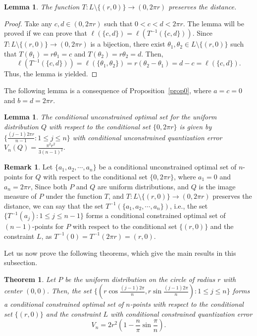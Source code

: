 \documentclass[12pt, reqno]{amsart}
\theoremstyle{plain}
\newtheorem{theorem1}[subsubsection]{Theorem}
\newtheorem{lemma1}[subsubsection]{Lemma}
\theoremstyle{definition}
\newtheorem{remark1}[subsubsection]{Remark}
\newcommand{\set}[1]{\{#1\}}%
\newcommand{\gq}{\theta}
\begin{document}
\begin{lemma1}\label{lemma22} 
The function $T: L\setminus \set{(r, 0)} \to (0, 2\pi r) $ preserves the distance. 
\end{lemma1} 
\begin{proof} 
Take any $c, d\in (0, 2\pi r)$ such that $0< c<d<2\pi r$. The lemma will be proved if we can prove that $\ell(\set{c, d})=\ell(T^{-1}(\set{c, d}))$. Since $T: L\setminus \set{(r, 0)} \to (0, 2\pi r) $ is a bijection, there exist $\gq_1, \gq_2\in L\setminus \set{(r, 0)}$ such that $T(\gq_1)=r\gq_1=c$ and $T(\gq_2)=r\gq_2=d$. Then, 
\[\ell(T^{-1}(\set{c, d}))=\ell(\set{\gq_1, \gq_2})=r(\gq_2-\gq_1)=d-c =\ell(\set{c, d}).\]
Thus, the lemma is yielded. 
\end{proof} 
The following lemma is a consequence of Proposition~\ref{prop0}, where $a=c=0$ and $b=d=2\pi r$.
\begin{lemma1}\label{lemma23} 
The conditional unconstrained optimal set for the uniform distribution $Q$ with respect to the conditional set $\set{0, 2\pi r}$ is given by 
$\Big\{\frac{(j-1)2\pi r}{n-1} : 1\leq j\leq n\Big\}$ 
with  conditional unconstrained quantization error $V_n(Q)=\frac{\pi^2 r^2}{3(n-1)^2}.$
\end{lemma1}

\begin{remark1} \label{rem0} 
Let $\set{a_1, a_2, \cdots, a_n}$ be a conditional unconstrained optimal set of $n$-points for $Q$ with respect to the conditional set $\set{0, 2\pi r}$, where $a_1=0$ and $a_n=2\pi r$,
Since both $P$ and $Q$ are uniform distributions, and $Q$ is the image measure of $P$ under the function $T$, and $T: L\setminus \set{(r, 0)} \to (0, 2\pi r) $ preserves the distance, we can say that the set $T^{-1}(\set{a_1, a_2, \cdots, a_{n}})$, i.e., the set  $\set{T^{-1}(a_j) : 1\leq j\leq n-1}$ forms a conditional constrained optimal set of $(n-1)$-points for $P$ with respect to the conditional set $\set{(r, 0)}$ and the constraint $L$, as $T^{-1}(0)=T^{-1}(2\pi r)= (r, 0) $. 
\end{remark1}

Let us now prove the following theorems, which give the main results in this subsection. 

\begin{theorem1} \label{theoM001}
Let $P$ be the uniform distribution on the circle of radius $r$ with center $(0, 0)$. Then, the set $\set{(r\cos \frac{(j-1)2\pi}{n}, r\sin \frac{(j-1)2\pi}{n}) : 1\leq j\leq n}$ forms a conditional constrained optimal set of $n$-points with respect to the conditional set $\set{(r, 0)}$ and the constraint $L$ with conditional constrained quantization error 
\[V_n=2r^2(1-\frac n \pi\sin \frac \pi n).\]
\end{theorem1}
\end{document}
